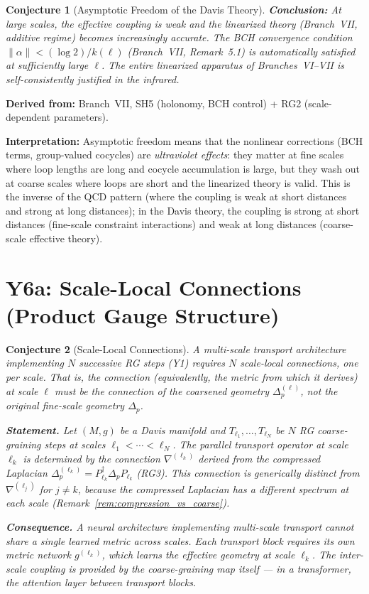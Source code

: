 \documentclass[11pt,letterpaper]{article}
\newtheorem{conjecture}{Conjecture}[section]
\begin{document}
\begin{conjecture}[Asymptotic Freedom of the Davis 
Theory]
\textbf{Conclusion:} At large scales, the effective coupling is 
weak and the linearized theory (Branch~VII, additive regime) 
becomes increasingly accurate. The BCH convergence condition 
$\|\alpha\| < (\log 2) / k(\ell)$ (Branch~VII, 
Remark~5.1) is automatically satisfied at sufficiently 
large $\ell$. The entire linearized apparatus of Branches~VI--VII 
is \emph{self-consistently justified in the infrared}.
\end{conjecture}

\textbf{Derived from:} Branch~VII, SH5 (holonomy, BCH control) + 
RG2 (scale-dependent parameters).

\textbf{Interpretation:} Asymptotic freedom means that the 
nonlinear corrections (BCH terms, group-valued cocycles) are 
\emph{ultraviolet effects}: they matter at fine scales where loop 
lengths are long and cocycle accumulation is large, but they wash 
out at coarse scales where loops are short and the linearized 
theory is valid. This is the inverse of the QCD pattern (where the 
coupling is weak at short distances and strong at long distances); 
in the Davis theory, the coupling is strong at short distances 
(fine-scale constraint interactions) and weak at long distances 
(coarse-scale effective theory).

\section{Y6a: Scale-Local Connections (Product Gauge Structure)}

\begin{conjecture}[Scale-Local 
Connections]\label{conj:scale_local}
A multi-scale transport architecture implementing $N$ successive 
RG steps (Y1) requires $N$ \emph{scale-local connections}, one per 
scale. That is, the connection (equivalently, the metric from which 
it derives) at scale $\ell$ must be the connection of the 
\emph{coarsened} geometry $\Delta_p^{(\ell)}$, not the original 
fine-scale geometry $\Delta_p$.

\textbf{Statement.} Let $(M, g)$ be a Davis manifold and 
$T_{\ell_1}, \ldots, T_{\ell_N}$ be $N$ RG coarse-graining 
steps at scales $\ell_1 < \cdots < \ell_N$. The parallel 
transport operator at scale $\ell_k$ is determined by the 
connection $\nabla^{(\ell_k)}$ derived from the compressed 
Laplacian $\Delta_p^{(\ell_k)} = P_{\ell_k}^\dagger \Delta_p 
P_{\ell_k}$ (RG3). This connection is generically distinct from 
$\nabla^{(\ell_j)}$ for $j \neq k$, because the compressed 
Laplacian has a different spectrum at each scale 
(Remark~\ref{rem:compression_vs_coarse}).

\textbf{Consequence.} A neural architecture implementing 
multi-scale transport cannot share a single learned metric across 
scales. Each transport block requires its own metric network 
$g^{(\ell_k)}$, which learns the effective geometry at scale 
$\ell_k$. The inter-scale coupling is provided by the 
coarse-graining map itself --- in a transformer, the attention 
layer between transport blocks.
\end{conjecture}
\end{document}
